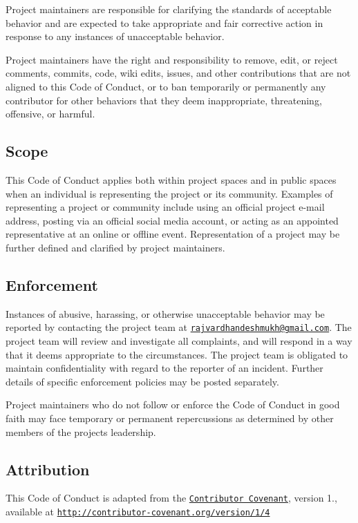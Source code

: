 Project maintainers are responsible for clarifying the standards of acceptable behavior and are expected to take appropriate and fair corrective action in response to any instances of unacceptable behavior.

Project maintainers have the right and responsibility to remove, edit, or reject comments, commits, code, wiki edits, issues, and other contributions that are not aligned to this Code of Conduct, or to ban temporarily or permanently any contributor for other behaviors that they deem inappropriate, threatening, offensive, or harmful.

\subsection*{Scope}

This Code of Conduct applies both within project spaces and in public spaces when an individual is representing the project or its community. Examples of representing a project or community include using an official project e-\/mail address, posting via an official social media account, or acting as an appointed representative at an online or offline event. Representation of a project may be further defined and clarified by project maintainers.

\subsection*{Enforcement}

Instances of abusive, harassing, or otherwise unacceptable behavior may be reported by contacting the project team at \href{mailto:rajvardhandeshmukh@gmail.com}{\tt rajvardhandeshmukh@gmail.\+com}. The project team will review and investigate all complaints, and will respond in a way that it deems appropriate to the circumstances. The project team is obligated to maintain confidentiality with regard to the reporter of an incident. Further details of specific enforcement policies may be posted separately.

Project maintainers who do not follow or enforce the Code of Conduct in good faith may face temporary or permanent repercussions as determined by other members of the project\textquotesingle{}s leadership.

\subsection*{Attribution}

This Code of Conduct is adapted from the \href{http://contributor-covenant.org}{\tt Contributor Covenant}, version 1., available at \href{http://contributor-covenant.org/version/1/4/}{\tt http\+://contributor-\/covenant.\+org/version/1/4} 